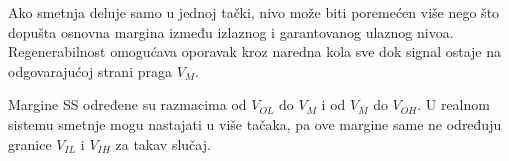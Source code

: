 Ako smetnja deluje samo u jednoj tački, nivo može biti poremećen više nego što dopušta osnovna margina između izlaznog i garantovanog ulaznog nivoa. Regenerabilnost omogućava oporavak kroz naredna kola sve dok signal ostaje na odgovarajućoj strani praga $V_M$.

Margine SS određene su razmacima od $V_{OL}$ do $V_M$ i od $V_M$ do $V_{OH}$. U realnom sistemu smetnje mogu nastajati u više tačaka, pa ove margine same ne određuju granice $V_{IL}$ i $V_{IH}$ za takav slučaj.
